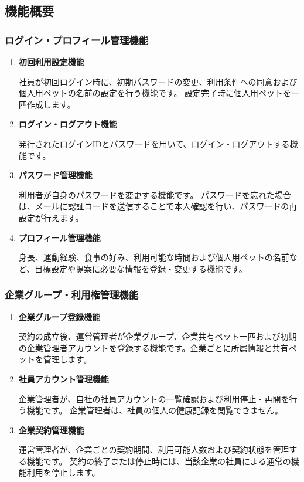 \documentclass[uplatex,dvipdfmx]{jlreq}
\begin{document}
\subsection{機能概要}
\subsubsection{ログイン・プロフィール管理機能}

\begin{enumerate}
\item \textbf{初回利用設定機能}

社員が初回ログイン時に、初期パスワードの変更、利用条件への同意および個人用ペットの名前の設定を行う機能です。
設定完了時に個人用ペットを一匹作成します。

\item \textbf{ログイン・ログアウト機能}

発行されたログインIDとパスワードを用いて、ログイン・ログアウトする機能です。

\item \textbf{パスワード管理機能}

利用者が自身のパスワードを変更する機能です。
パスワードを忘れた場合は、メールに認証コードを送信することで本人確認を行い、パスワードの再設定が行えます。

\item \textbf{プロフィール管理機能}

身長、運動経験、食事の好み、利用可能な時間および個人用ペットの名前など、目標設定や提案に必要な情報を登録・変更する機能です。
\end{enumerate}



\subsubsection{企業グループ・利用権管理機能}
\begin{enumerate}
\item \textbf{企業グループ登録機能}

契約の成立後、運営管理者が企業グループ、企業共有ペット一匹および初期の企業管理者アカウントを登録する機能です。企業ごとに所属情報と共有ペットを管理します。

\item \textbf{社員アカウント管理機能}

企業管理者が、自社の社員アカウントの一覧確認および利用停止・再開を行う機能です。
企業管理者は、社員の個人の健康記録を閲覧できません。

\item \textbf{企業契約管理機能}

運営管理者が、企業ごとの契約期間、利用可能人数および契約状態を管理する機能です。
契約の終了または停止時には、当該企業の社員による通常の機能利用を停止します。
\end{enumerate}
\end{document}
